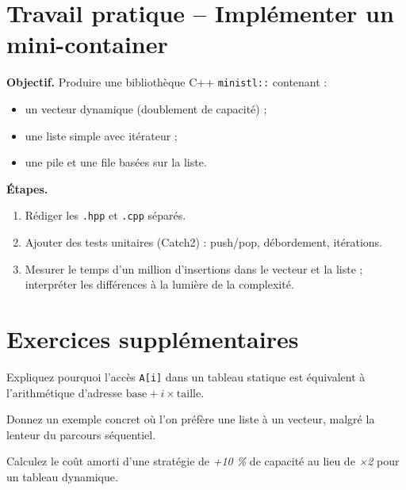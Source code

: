 \section*{Travail pratique – Implémenter un mini-container}

\begin{tp}
\textbf{Objectif.}  Produire une bibliothèque C++ \lstinline|ministl::|
contenant :
\begin{itemize}
  \item un vecteur dynamique (doublement de capacité) ;
  \item une liste simple avec itérateur ;
  \item une pile et une file basées sur la liste.
\end{itemize}
\textbf{Étapes.}
\begin{enumerate}
  \item Rédiger les \lstinline|.hpp| et \lstinline|.cpp| séparés.
  \item Ajouter des tests unitaires (Catch2) : push/pop, débordement, itérations.
  \item Mesurer le temps d’un million d’insertions dans le vecteur et la liste ;
        interpréter les différences à la lumière de la complexité.
\end{enumerate}
\end{tp}

\section*{Exercices supplémentaires}

\begin{exercice}
Expliquez pourquoi l’accès \lstinline|A[i]| dans un tableau statique
est équivalent à l’arithmétique d’adresse \(\text{base}+i\times\text{taille}\).
\end{exercice}

\begin{exercice}
Donnez un exemple concret où l’on préfère une liste à un vecteur,
malgré la lenteur du parcours séquentiel.
\end{exercice}

\begin{exercice}
Calculez le coût amorti d’une stratégie de \emph{+10 \%} de capacité
au lieu de \emph{×2} pour un tableau dynamique.
\end{exercice}

